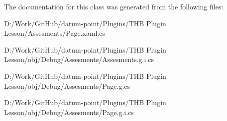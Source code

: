 The documentation for this class was generated from the following files\+:\begin{DoxyCompactItemize}
\item 
D\+:/\+Work/\+Git\+Hub/datum-\/point/\+Plugins/\+T\+H\+B Plugin Lesson/\+Assesments/Page.\+xaml.\+cs\item 
D\+:/\+Work/\+Git\+Hub/datum-\/point/\+Plugins/\+T\+H\+B Plugin Lesson/obj/\+Debug/\+Assesments/Assesments.\+g.\+i.\+cs\item 
D\+:/\+Work/\+Git\+Hub/datum-\/point/\+Plugins/\+T\+H\+B Plugin Lesson/obj/\+Debug/\+Assesments/Page.\+g.\+cs\item 
D\+:/\+Work/\+Git\+Hub/datum-\/point/\+Plugins/\+T\+H\+B Plugin Lesson/obj/\+Debug/\+Assesments/Page.\+g.\+i.\+cs\end{DoxyCompactItemize}
